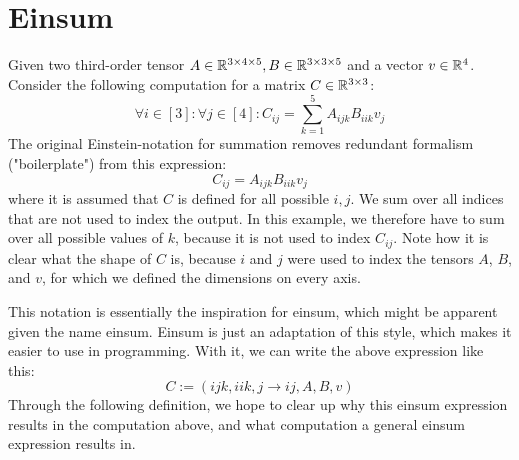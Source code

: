 \section{Einsum}
Given two third-order tensor $A \in \mathbb{R}^{3 \times 4 \times 5}, B \in \mathbb{R}^{3 \times 3 \times 5}$ and a vector $v \in \mathbb{R}^4$.
Consider the following computation for a matrix $C \in \mathbb{R}^{3 \times 3}$:
$$\forall i \in [3]: \forall j \in [4]: C_{ij} = \sum\limits_{k = 1}^{5} A_{ijk} B_{iik} v_j$$
The original Einstein-notation for summation removes redundant formalism ("boilerplate") from this expression:
$$C_{ij} = A_{ijk} B_{iik} v_j$$
where it is assumed that $C$ is defined for all possible $i,j$.
We sum over all indices that are not used to index the output.
In this example, we therefore have to sum over all possible values of $k$, because it is not used to index $C_{ij}$.
Note how it is clear what the shape of $C$ is, because $i$ and $j$ were used to index the tensors $A$, $B$, and $v$,
for which we defined the dimensions on every axis.

This notation is essentially the inspiration for einsum, which might be apparent given the name einsum.
Einsum is just an adaptation of this style, which makes it easier to use in programming.
With it, we can write the above expression like this:
$$C := (ijk, iik, j \rightarrow ij, A, B, v)$$
Through the following definition, we hope to clear up why this einsum expression results in the computation above,
and what computation a general einsum expression results in.

